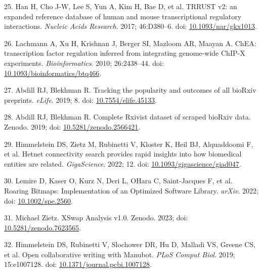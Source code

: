 \begin{CSLReferences}{0}{0}
\leavevmode{}%
25. Han H, Cho J-W, Lee S, Yun A, Kim H, Bae D, et al. TRRUST v2: an expanded reference database of human and mouse transcriptional regulatory interactions. \emph{Nucleic Acids Research}. 2017; 46:D380--6. doi: \href{https://doi.org/10.1093/nar/gkx1013}{10.1093/nar/gkx1013}.

\leavevmode{}%
26. Lachmann A, Xu H, Krishnan J, Berger SI, Mazloom AR, Ma\textquotesingle ayan A. ChEA: transcription factor regulation inferred from integrating genome-wide ChIP-X experiments. \emph{Bioinformatics}. 2010; 26:2438--44. doi: \href{https://doi.org/10.1093/bioinformatics/btq466}{10.1093/bioinformatics/btq466}.

\leavevmode{}%
27. Abdill RJ, Blekhman R. Tracking the popularity and outcomes of all bioRxiv preprints. \emph{eLife}. 2019; 8. doi: \href{https://doi.org/10.7554/elife.45133}{10.7554/elife.45133}.

\leavevmode{}%
28. Abdill RJ, Blekhman R. Complete Rxivist dataset of scraped bioRxiv data. Zenodo. 2019; doi: \href{https://doi.org/10.5281/zenodo.2566421}{10.5281/zenodo.2566421}.

\leavevmode{}%
29. Himmelstein DS, Zietz M, Rubinetti V, Kloster K, Heil BJ, Alquaddoomi F, et al. Hetnet connectivity search provides rapid insights into how biomedical entities are related. \emph{GigaScience}. 2022; 12. doi: \href{https://doi.org/10.1093/gigascience/giad047}{10.1093/gigascience/giad047}.

\leavevmode{}%
30. Lemire D, Kaser O, Kurz N, Deri L, O\textquotesingle Hara C, Saint-Jacques F, et al. Roaring Bitmaps: Implementation of an Optimized Software Library. \emph{arXiv}. 2022; doi: \href{https://doi.org/10.1002/spe.2560}{10.1002/spe.2560}.

\leavevmode{}%
31. Michael Zietz. XSwap Analysis v1.0. Zenodo. 2023; doi: \href{https://doi.org/10.5281/zenodo.7623565}{10.5281/zenodo.7623565}.

\leavevmode{}%
32. Himmelstein DS, Rubinetti V, Slochower DR, Hu D, Malladi VS, Greene CS, et al. Open collaborative writing with Manubot. \emph{PLoS Comput Biol}. 2019; 15:e1007128. doi: \href{https://doi.org/10.1371/journal.pcbi.1007128}{10.1371/journal.pcbi.1007128}.


\end{CSLReferences}
